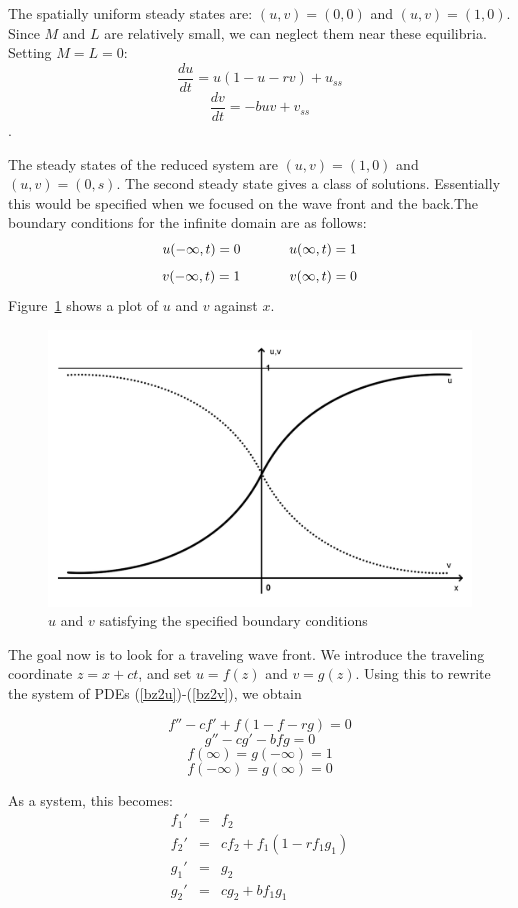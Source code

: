 \documentclass[]{article}
\numberwithin{equation}{section}		%
\def\bea{\begin{eqnarray}}
\def\ena{\end{eqnarray}}
\begin{document}
The spatially uniform steady states are: $(u,v)=(0,0)$ and $(u,v)=(1,0)$. Since $M$ and $L$ are relatively small, we can neglect them near these equilibria. Setting $M=L=0$:
$$\frac{du}{dt} = u(1-u-rv)+u_{ss}$$
$$\frac{dv}{dt} = -buv+v_{ss}$$.

The steady states of the reduced system are $(u,v)=(1,0)$ and $(u,v)=(0,s)$. The second steady state gives a class of solutions. Essentially  this would be specified when we focused on the wave front and the back.The boundary conditions for the infinite domain are as follows:
$$u(-\infty,t)=0\hspace{0.5in}u(\infty,t)=1$$
$$v(-\infty,t)=1\hspace{0.5in}v(\infty,t)=0$$ Figure~\ref{fig:bz2} shows a plot of $u$ and $v$ against $x$.
\begin{figure}
\caption{$u$ and $v$ satisfying the specified boundary conditions}
\begin{center}
\includegraphics[scale=.20]{figures/BZ_model2.jpg}
\end{center}
\label{fig:bz2}
\end{figure}
\newpage
The goal now is to look for a traveling wave front. We introduce the traveling coordinate $z=x+ct$, and set $u=f(z)$ and $v=g(z)$.
Using this to rewrite the system of PDEs (\ref{bz2u})-(\ref{bz2v}), we obtain

$$f''-cf'+f(1-f-rg)= 0$$
$$g''-cg'-bfg =0$$
$$f(\infty)=g(-\infty)=1$$
$$f(-\infty)=g(\infty)=0$$

As a system, this becomes:
\bea
f_1' &=& f_2 \nonumber \\
f_2' &=& c f_2+f_1(1-rf_1g_1) \nonumber \\
g_1' &=& g_2 \nonumber \\
g_2'&=& cg_2+bf_1g_1 \nonumber
\ena
\end{document}
